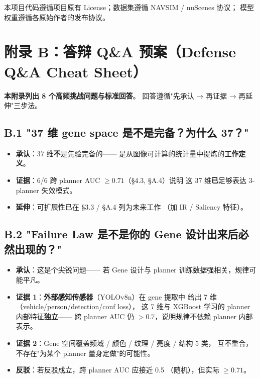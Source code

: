 \documentclass[a4paper,12pt,fontset=fandol]{ctexart}
\begin{document}
{本项目代码遵循项目原有 License；数据集遵循 NAVSIM / nuScenes 协议；
模型权重遵循各原始作者的发布协议。

\newpage
\section*{附录 B：答辩 Q\&A 预案（Defense Q\&A Cheat Sheet）}
\small

\noindent\textbf{本附录列出 8 个高频挑战问题与标准回答}。
回答遵循"先承认 → 再证据 → 再延伸"三步法。

\subsection*{B.1 "37 维 gene space 是不是完备？为什么 37？"}

\begin{itemize}[leftmargin=*]
\item \textbf{承认}：37 维\textbf{不}是先验完备的——
      是从图像可计算的统计量中提炼的\textbf{工作定义}。
\item \textbf{证据}：6/6 跨 planner AUC $\geq 0.71$（§4.3, §A.4）说明
      这 37 维\textbf{已}足够表达 3-planner 失效模式。
\item \textbf{延伸}：可扩展性已在 §3.3 / §A.4 列为未来工作
      （加 IR / Saliency 特征）。
\end{itemize}

\subsection*{B.2 "Failure Law 是不是你的 Gene 设计出来后必然出现的？"}

\begin{itemize}[leftmargin=*]
\item \textbf{承认}：这是个尖锐问题——
      若 Gene 设计与 planner 训练数据强相关，规律可能平凡。
\item \textbf{证据 1}：\textbf{外部感知传感器}（YOLOv8n）在 gene 提取中
      给出 7 维（vehicle/person/detection/conf loss），
      这 7 维与 XGBoost 学习的 planner 内部特征\textbf{独立}——
      跨 planner AUC 仍 $> 0.7$，说明规律不依赖 planner 内部表示。
\item \textbf{证据 2}：Gene 空间覆盖频域 / 颜色 / 纹理 / 亮度 / 结构 5 类，
      互不重合，不存在"为某个 planner 量身定做"的可能性。
\item \textbf{反驳}：若反驳成立，跨 planner AUC 应接近 0.5
      （随机），但实际 $\geq 0.71$。
\end{itemize}

}
\end{document}
